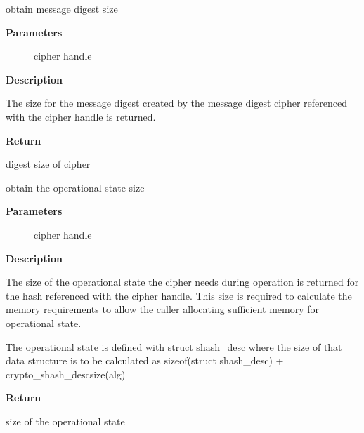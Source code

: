 \documentclass[a4paper,8pt,english]{sphinxmanual}
\begin{document}
\begin{fulllineitems}
\label{crypto/api-digest:c.crypto_shash_digestsize}
obtain message digest size

\end{fulllineitems}


\textbf{Parameters}
\begin{description}
\item[{}] \leavevmode
cipher handle

\end{description}

\textbf{Description}

The size for the message digest created by the message digest cipher
referenced with the cipher handle is returned.

\textbf{Return}

digest size of cipher

\begin{fulllineitems}
\label{crypto/api-digest:c.crypto_shash_descsize}
obtain the operational state size

\end{fulllineitems}


\textbf{Parameters}
\begin{description}
\item[{}] \leavevmode
cipher handle

\end{description}

\textbf{Description}

The size of the operational state the cipher needs during operation is
returned for the hash referenced with the cipher handle. This size is
required to calculate the memory requirements to allow the caller allocating
sufficient memory for operational state.

The operational state is defined with struct shash\_desc where the size of
that data structure is to be calculated as
sizeof(struct shash\_desc) + crypto\_shash\_descsize(alg)

\textbf{Return}

size of the operational state
\end{document}
